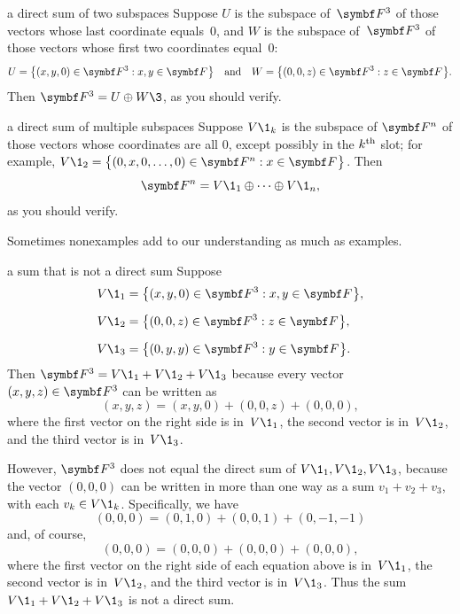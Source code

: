 \begin{example}{a direct sum of two subspaces}
Suppose $U$ is the subspace
of~$\F{3}$ of those vectors whose last coordinate equals~$0$, and
$W$ is the subspace of~$\F{3}$ of those vectors whose first two
coordinates equal~$0$:
\[
U = \br[\big]{(x, y, 0) \in \F{3}: x, y \in \F{}} \andd W = \br[\big]{(0, 0, z) \in \F{3}: z \in \F{}}.
\]
Then $\F{3} = U \oplus W\3$, as you should verify.
\end{example}

\pagebreak[2]

\begin{example}{a direct sum of multiple subspaces}
Suppose $V\1_k$ is the subspace of $\F{n}$ of those vectors whose coordinates are all $0$, except possibly in the $k^{\text{{th}}}$ slot; for example, \mbox{$V\1_2 = \br[\big]{(0, x, 0, \dots, 0) \in \F{n}: x \in \F{}}$}.  Then
\[
\F{n} = V\1_1 \oplus \dots \oplus V\1_n,
\]
as you should verify.
\end{example}

Sometimes nonexamples add to our understanding as much as examples.

\begin{example}[3direct]{a sum that is not a direct sum}
Suppose
\begin{align*}
V\1_1 &= \br[\big]{(x, y, 0) \in \F{3}: x, y \in \F{}}, \\[6bp]
V\1_2 &= \br[\big]{(0, 0, z) \in \F{3}: z \in \F{}}, \\[6bp]
V\1_3 &= \br[\big]{(0, y, y) \in \F{3}: y \in \F{}}.
\end{align*}
Then $\F{3} = V\1_1 + V\1_2 + V\1_3$ because every vector
$(x, y, z) \in \F{3}$ can be written as
\[
(x, y, z) = (x, y, 0) + (0, 0, z) + (0, 0, 0),
\]
where the first vector on the right side is in~$V\1_1$, the second vector is
in~$V\1_2$, and the third vector is in~$V\1_3$.

However, $\F{3}$ does not equal the direct sum of $V\1_1, V\1_2 , V\1_3$, because the vector
$(0,0,0)$ can be written in more than one way as a sum $v_1 + v_2 + v_3$, with
each $v_k \in V\1_k$.   Specifically, we have
\[
(0,0,0) = (0,1,0) + (0,0,1) + (0,-1,-1)
\]
and, of course,
\[
(0,0,0) = (0,0,0) + (0,0,0) + (0,0,0),
\]
where the first vector on the right side of each equation above is in~$V\1_1$, the
second vector is in~$V\1_2$, and the third vector is in~$V\1_3$. Thus the sum $V\1_1 + V\1_2 + V\1_3$ is not a direct sum.
\end{example}

